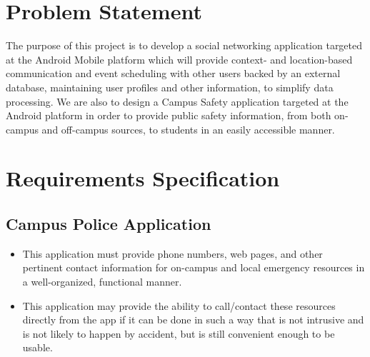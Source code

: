 \documentclass[11pt]{article}
\begin{document}
\section{Problem Statement}

The purpose of this project is to develop a social networking application 
targeted at the Android Mobile platform which will provide context- and 
location-based communication and event scheduling with other users backed by 
an external database, maintaining user profiles and 
other information, to simplify data processing. We are also to design a 
Campus Safety application targeted at the Android platform in order to provide
public safety information, from both on-campus and off-campus sources, 
to students in an easily accessible manner.


\section{Requirements Specification}

\subsection{Campus Police Application}
\begin{itemize}
\item This application must provide phone numbers, web pages, and other pertinent 
contact information for on-campus and local emergency resources in a 
well-organized, functional manner.
 \item This application may provide the ability to call/contact these resources 
directly from the app if it can be done in such a way that is not intrusive 
and is not likely to happen by accident, but is still convenient enough to be 
usable.
\end{itemize}
\end{document}
